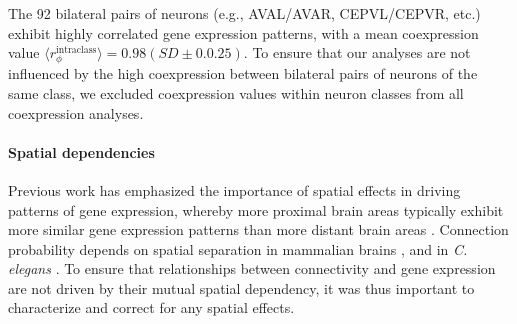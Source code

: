 \documentclass[10pt,letterpaper]{article}
\begin{document}
The 92 bilateral pairs of neurons (e.g., AVAL/AVAR, CEPVL/CEPVR, etc.) exhibit highly correlated gene expression patterns, with a mean coexpression value $\langle r_\phi^{\mathrm{intraclass}} \rangle = 0.98 (SD\pm0.0.25)$.
To ensure that our analyses are not influenced by the high coexpression between bilateral pairs of neurons of the same class, we excluded coexpression values within neuron classes from all coexpression analyses.

\paragraph{Spatial dependencies}
Previous work has emphasized the importance of spatial effects in driving patterns of gene expression, whereby more proximal brain areas typically exhibit more similar gene expression patterns than more distant brain areas \cite{Krienen2016, Fulcher:2016ck, Pantazatos:2016ir, Richiardi:2017hb}.
Connection probability depends on spatial separation in mammalian brains \cite{Henderson:2014fg, Horvat:2016ia, Wang:2016gg, Markov:2013jo}, and in \emph{C. elegans} \cite{Azulay:2016cg}.
To ensure that relationships between connectivity and gene expression are not driven by their mutual spatial dependency, it was thus important to characterize and correct for any spatial effects.
\end{document}
